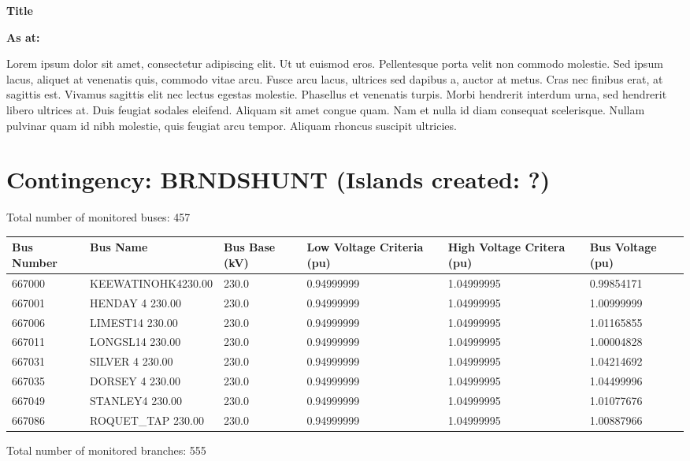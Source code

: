 \documentclass{article}%
\begin{document}
%
\normalsize%
\begin{Large}%
\textbf{Title}%
\end{Large}%
\linebreak%
\begin{large}%
\textbf{As at:}%
\end{large}%
Lorem ipsum dolor sit amet, consectetur adipiscing elit. Ut ut euismod eros. Pellentesque porta velit non commodo molestie. Sed ipsum lacus, aliquet at venenatis quis, commodo vitae arcu. Fusce arcu lacus, ultrices sed dapibus a, auctor at metus. Cras nec finibus erat, at sagittis est. Vivamus sagittis elit nec lectus egestas molestie. Phasellus et venenatis turpis. Morbi hendrerit interdum urna, sed hendrerit libero ultrices at. Duis feugiat sodales eleifend. Aliquam sit amet congue quam. Nam et nulla id diam consequat scelerisque. Nullam pulvinar quam id nibh molestie, quis feugiat arcu tempor. Aliquam rhoncus suscipit ultricies.%
\section*{Contingency: BRNDSHUNT (Islands created: ?)}%
\label{sec:ContingencyBRNDSHUNT(Islandscreated?)}%
Total number of monitored buses: 457%
\newline%
%
\begin{tabularx}{\columnwidth}{| p{2cm} | p{3.68cm} | p{1.6cm} | p{2.30cm} | p{2.30cm} | p{2.30cm} |}%
\hline%
Bus Number&Bus Name&Bus Base (kV)&Low Voltage Criteria (pu)&High Voltage Critera (pu)&Bus Voltage (pu)\\%
\hline%
\hline%
667000&KEEWATINOHK4230.00&230.0&0.94999999&1.04999995&0.99854171\\%
\hline%
667001&HENDAY 4    230.00&230.0&0.94999999&1.04999995&1.00999999\\%
\hline%
667006&LIMEST14    230.00&230.0&0.94999999&1.04999995&1.01165855\\%
\hline%
667011&LONGSL14    230.00&230.0&0.94999999&1.04999995&1.00004828\\%
\hline%
667031&SILVER 4    230.00&230.0&0.94999999&1.04999995&1.04214692\\%
\hline%
667035&DORSEY 4    230.00&230.0&0.94999999&1.04999995&1.04499996\\%
\hline%
667049&STANLEY4    230.00&230.0&0.94999999&1.04999995&1.01077676\\%
\hline%
667086&ROQUET\_TAP  230.00&230.0&0.94999999&1.04999995&1.00887966\\%
\hline%
\end{tabularx}%
Total number of monitored branches: 555

%
\end{document}
